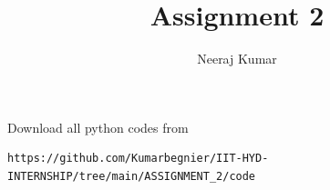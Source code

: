 \documentclass[journal,12pt,twocolumn]{IEEEtran}
\DeclareMathOperator*{\Res}{Res}
\begin{document}
\newtheorem{theorem}{Theorem}[section]
\newtheorem{problem}{Problem}
\newtheorem{proposition}{Proposition}[section]
\newtheorem{lemma}{Lemma}[section]
\newtheorem{corollary}[theorem]{Corollary}
\newtheorem{example}{Example}[section]
\newtheorem{definition}[problem]{Definition}

\newcommand{\BEQA}{\begin{eqnarray}}
\newcommand{\EEQA}{\end{eqnarray}}
\newcommand{\define}{\stackrel{\triangle}{=}}

\providecommand{\mbf}{\mathbf}
\providecommand{\pr}[1]{\ensuremath{\Pr\left(#1\right)}}
\providecommand{\qfunc}[1]{\ensuremath{Q\left(#1\right)}}
\providecommand{\sbrak}[1]{\ensuremath{{}\left[#1\right]}}
\providecommand{\lsbrak}[1]{\ensuremath{{}\left[#1\right.}}
\providecommand{\rsbrak}[1]{\ensuremath{{}\left.#1\right]}}
\providecommand{\brak}[1]{\ensuremath{\left(#1\right)}}
\providecommand{\lbrak}[1]{\ensuremath{\left(#1\right.}}
\providecommand{\rbrak}[1]{\ensuremath{\left.#1\right)}}
\providecommand{\cbrak}[1]{\ensuremath{\left\{#1\right\}}}
\providecommand{\lcbrak}[1]{\ensuremath{\left\{#1\right.}}
\providecommand{\rcbrak}[1]{\ensuremath{\left.#1\right\}}}
\theoremstyle{remark}
\newtheorem{rem}{Remark}
\newcommand{\sgn}{\mathop{\mathrm{sgn}}}
\providecommand{\abs}[1]{\l\vert#1\r\vert}
\providecommand{\res}[1]{\Res\displaylimits_{#1}}
\providecommand{\norm}[1]{\lVert#1\rVert}
\providecommand{\mtx}[1]{\mathbf{#1}}
\providecommand{\mean}[1]{E\l[ #1 \r]}
\providecommand{\fourier}{\overset{\mathcal{F}}{ \rightleftharpoons}}
\providecommand{\system}{\overset{\mathcal{H}}{ \longleftrightarrow}}
\newcommand{\solution}{\noindent \textbf{Solution: }}
\newcommand{\cosec}{\,\text{cosec}\,}
\providecommand{\dec}[2]{\ensuremath{\overset{#1}{\underset{#2}{\gtrless}}}}
\newcommand{\myvec}[1]{\ensuremath{\begin{pmatrix}#1\end{pmatrix}}}
\newcommand{\mydet}[1]{\ensuremath{\begin{vmatrix}#1\end{vmatrix}}}
\makeatletter
{}
\makeatother
\let\StandardTheFigure\thefigure
\let\vec\mathbf
\renewcommand{\thefigure}{\theproblem}
\def\putbox#1#2#3{\makebox[0in][l]{\makebox[#1][l]{}\raisebox{\baselineskip}[0in][0in]{\raisebox{#2}[0in][0in]{#3}}}}
\def\rightbox#1{\makebox[0in][r]{#1}}
\def\centbox#1{\makebox[0in]{#1}}
\def\topbox#1{\raisebox{-\baselineskip}[0in][0in]{#1}}
\def\midbox#1{\raisebox{-0.5\baselineskip}[0in][0in]{#1}}
\vspace{3cm}
\title{Assignment 2}
\author{Neeraj Kumar}
\maketitle
\newpage
\bigskip
\renewcommand{\thefigure}{\theenumi}
\renewcommand{\thetable}{\theenumi}
Download all python codes from
\begin{lstlisting}
https://github.com/Kumarbegnier/IIT-HYD-INTERNSHIP/tree/main/ASSIGNMENT_2/code
\end{lstlisting}
\end{document}

